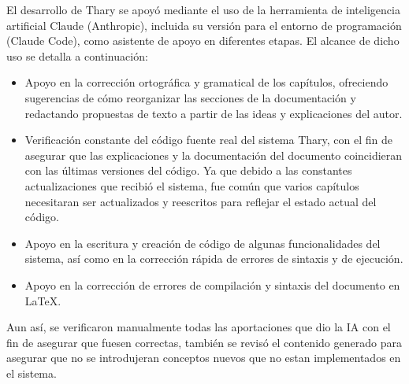 El desarrollo de Thary se apoyó mediante el uso de la herramienta de inteligencia artificial Claude (Anthropic), incluida su versión para el entorno de programación (Claude Code), como asistente de apoyo en diferentes etapas. El alcance de dicho uso se detalla a continuación:

\begin{itemize}
    \item Apoyo en la corrección ortográfica y gramatical de los capítulos, ofreciendo sugerencias de cómo reorganizar las secciones de la documentación y redactando propuestas de texto a partir de las ideas y explicaciones del autor.
    \item Verificación constante del código fuente real del sistema Thary, con el fin de asegurar que las explicaciones y la documentación del documento coincidieran con las últimas versiones del código. Ya que debido a las constantes actualizaciones que recibió el sistema, fue común que varios capítulos necesitaran ser actualizados y reescritos para reflejar el estado actual del código.
    \item Apoyo en la escritura y creación de código de algunas funcionalidades del sistema, así como en la corrección rápida de errores de sintaxis y de ejecución.
    \item Apoyo en la corrección de errores de compilación y sintaxis del documento en \LaTeX.
\end{itemize}

Aun así, se verificaron manualmente todas las aportaciones que dio la IA con el fin de asegurar que fuesen correctas, también se revisó el contenido generado para asegurar que no se introdujeran conceptos nuevos que no estan implementados en el sistema.